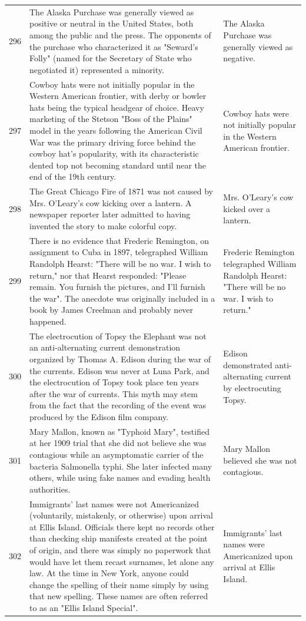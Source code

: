 \begin{tabular}{c|p{}|p{}}
296 & The Alaska Purchase was generally viewed as positive or neutral in the United States, both among the public and the press. The opponents of the purchase who characterized it as "Seward's Folly" (named for the Secretary of State who negotiated it) represented a minority. & The Alaska Purchase was generally viewed as negative. \\
297 & Cowboy hats were not initially popular in the Western American frontier, with derby or bowler hats being the typical headgear of choice. Heavy marketing of the Stetson "Boss of the Plains" model in the years following the American Civil War was the primary driving force behind the cowboy hat's popularity, with its characteristic dented top not becoming standard until near the end of the 19th century. & Cowboy hats were not initially popular in the Western American frontier. \\
298 & The Great Chicago Fire of 1871 was not caused by Mrs. O'Leary's cow kicking over a lantern. A newspaper reporter later admitted to having invented the story to make colorful copy. & Mrs. O'Leary's cow kicked over a lantern. \\
299 & There is no evidence that Frederic Remington, on assignment to Cuba in 1897, telegraphed William Randolph Hearst: "There will be no war. I wish to return," nor that Hearst responded: "Please remain. You furnish the pictures, and I'll furnish the war". The anecdote was originally included in a book by James Creelman and probably never happened. & Frederic Remington telegraphed William Randolph Hearst: "There will be no war. I wish to return." \\
300 & The electrocution of Topsy the Elephant was not an anti-alternating current demonstration organized by Thomas A. Edison during the war of the currents. Edison was never at Luna Park, and the electrocution of Topsy took place ten years after the war of currents. This myth may stem from the fact that the recording of the event was produced by the Edison film company. & Edison demonstrated anti-alternating current by electrocuting Topsy. \\
301 & Mary Mallon, known as "Typhoid Mary", testified at her 1909 trial that she did not believe she was contagious while an asymptomatic carrier of the bacteria Salmonella typhi. She later infected many others, while using fake names and evading health authorities. & Mary Mallon believed she was not contagious. \\
302 & Immigrants' last names were not Americanized (voluntarily, mistakenly, or otherwise) upon arrival at Ellis Island. Officials there kept no records other than checking ship manifests created at the point of origin, and there was simply no paperwork that would have let them recast surnames, let alone any law. At the time in New York, anyone could change the spelling of their name simply by using that new spelling. These names are often referred to as an "Ellis Island Special". & Immigrants' last names were Americanized upon arrival at Ellis Island. \\

\end{tabular}
